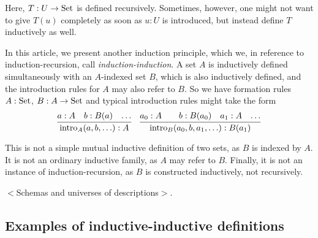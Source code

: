 \documentclass{article}
\begin{document}
Here, $T : U \to \text{Set}$ is defined recursively. Sometimes, however, one
might not want to give $T(u)$ completely as soon as $u : U$ is
introduced, but instead define $T$ inductively as well.

In this article, we present another induction principle, which we, in
reference to induction-recursion, call \emph{induction-induction}. A set $A$ is
inductively defined simultaneously with an $A$-indexed set $B$, which is also
inductively defined, and the introduction rules for $A$ may also refer to
$B$. So we have formation rules $A : \text{Set}$, $B : A \to \text{Set}$ and typical
introduction rules might take the form
\[ \infer{\text{intro}_A(a, b, \ldots) : A}{a : A &b : B(a) & \ldots} \quad
\infer{\text{intro}_B(a_0, b, a_1, \ldots) : B(a_1)}{a_0 : A &
&b : B(a_0) & a_1 : A & \ldots} \]

This is not a simple mutual inductive definition of two sets, as $B$
is indexed by $A$. It is not an ordinary inductive family, as $A$ may
refer to $B$. Finally, it is not an instance of induction-recursion,
as $B$ is constructed inductively, not recursively.

$<$Schemas and universes of descriptions$>$.






\subsection{Examples of inductive-inductive definitions}
\label{sec:examples}
\end{document}

